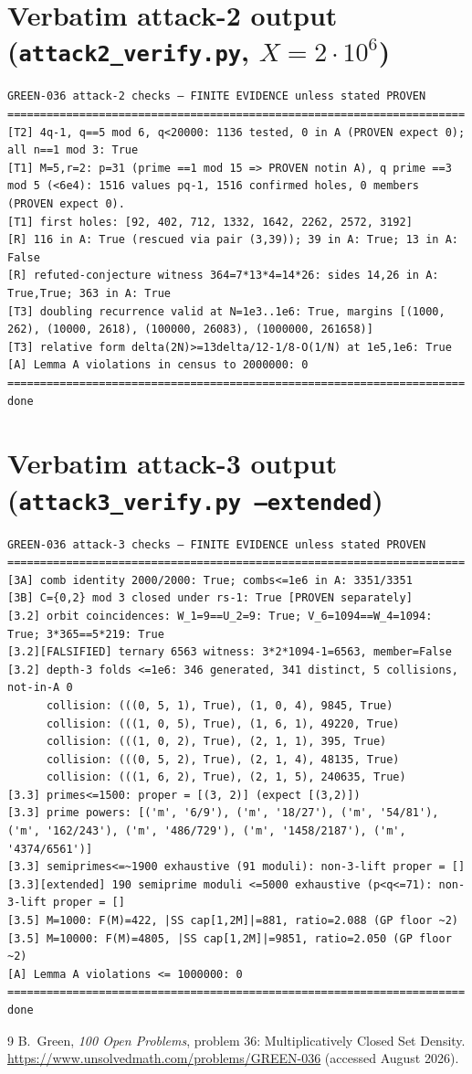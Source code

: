 \documentclass[11pt]{article}
\theoremstyle{definition}
\begin{document}
\section{Verbatim attack-2 output (\texttt{attack2\_verify.py}, \texorpdfstring{$X=2\cdot10^6$}{X=2*10^6})}
\tiny
\begin{verbatim}
GREEN-036 attack-2 checks — FINITE EVIDENCE unless stated PROVEN
======================================================================
[T2] 4q-1, q==5 mod 6, q<20000: 1136 tested, 0 in A (PROVEN expect 0); all n==1 mod 3: True
[T1] M=5,r=2: p=31 (prime ==1 mod 15 => PROVEN notin A), q prime ==3 mod 5 (<6e4): 1516 values pq-1, 1516 confirmed holes, 0 members (PROVEN expect 0).
[T1] first holes: [92, 402, 712, 1332, 1642, 2262, 2572, 3192]
[R] 116 in A: True (rescued via pair (3,39)); 39 in A: True; 13 in A: False
[R] refuted-conjecture witness 364=7*13*4=14*26: sides 14,26 in A: True,True; 363 in A: True
[T3] doubling recurrence valid at N=1e3..1e6: True, margins [(1000, 262), (10000, 2618), (100000, 26083), (1000000, 261658)]
[T3] relative form delta(2N)>=13delta/12-1/8-O(1/N) at 1e5,1e6: True
[A] Lemma A violations in census to 2000000: 0
======================================================================
done
\end{verbatim}
\normalsize

\section{Verbatim attack-3 output (\texttt{attack3\_verify.py --extended})}
\tiny
\begin{verbatim}
GREEN-036 attack-3 checks — FINITE EVIDENCE unless stated PROVEN
======================================================================
[3A] comb identity 2000/2000: True; combs<=1e6 in A: 3351/3351
[3B] C={0,2} mod 3 closed under rs-1: True [PROVEN separately]
[3.2] orbit coincidences: W_1=9==U_2=9: True; V_6=1094==W_4=1094: True; 3*365==5*219: True
[3.2][FALSIFIED] ternary 6563 witness: 3*2*1094-1=6563, member=False
[3.2] depth-3 folds <=1e6: 346 generated, 341 distinct, 5 collisions, not-in-A 0
      collision: (((0, 5, 1), True), (1, 0, 4), 9845, True)
      collision: (((1, 0, 5), True), (1, 6, 1), 49220, True)
      collision: (((1, 0, 2), True), (2, 1, 1), 395, True)
      collision: (((0, 5, 2), True), (2, 1, 4), 48135, True)
      collision: (((1, 6, 2), True), (2, 1, 5), 240635, True)
[3.3] primes<=1500: proper = [(3, 2)] (expect [(3,2)])
[3.3] prime powers: [('m', '6/9'), ('m', '18/27'), ('m', '54/81'), ('m', '162/243'), ('m', '486/729'), ('m', '1458/2187'), ('m', '4374/6561')]
[3.3] semiprimes<=~1900 exhaustive (91 moduli): non-3-lift proper = []
[3.3][extended] 190 semiprime moduli <=5000 exhaustive (p<q<=71): non-3-lift proper = []
[3.5] M=1000: F(M)=422, |SS cap[1,2M]|=881, ratio=2.088 (GP floor ~2)
[3.5] M=10000: F(M)=4805, |SS cap[1,2M]|=9851, ratio=2.050 (GP floor ~2)
[A] Lemma A violations <= 1000000: 0
======================================================================
done
\end{verbatim}
\normalsize

\begin{thebibliography}{9}
 B.~Green, \emph{100 Open Problems}, problem 36:
Multiplicatively Closed Set Density.
\url{https://www.unsolvedmath.com/problems/GREEN-036} (accessed August 2026).
\end{thebibliography}
\end{document}
